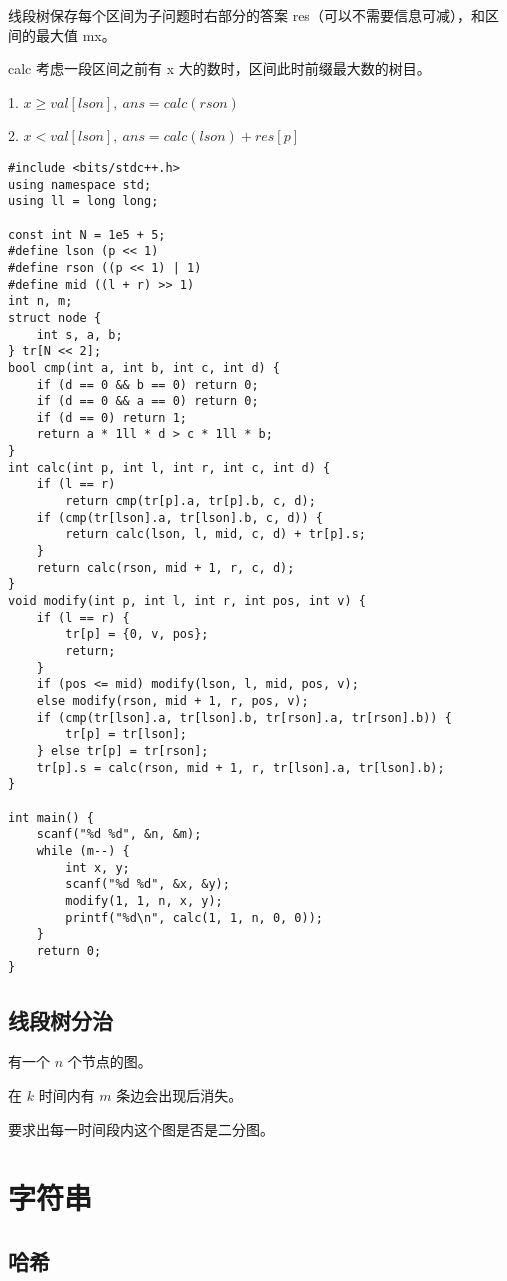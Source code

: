 \documentclass[a4paper]{article}
\begin{document}
线段树保存每个区间为子问题时右部分的答案 res（可以不需要信息可减），和区间的最大值 mx。

calc 考虑一段区间之前有 x 大的数时，区间此时前缀最大数的树目。

1. $x \geq val[lson],\ ans = calc(rson)$

2. $x < val[lson],\ ans = calc(lson) + res[p]$

\begin{lstlisting}
#include <bits/stdc++.h>
using namespace std;
using ll = long long;

const int N = 1e5 + 5;
#define lson (p << 1)
#define rson ((p << 1) | 1)
#define mid ((l + r) >> 1)
int n, m;
struct node {
    int s, a, b;
} tr[N << 2];
bool cmp(int a, int b, int c, int d) {
    if (d == 0 && b == 0) return 0;
    if (d == 0 && a == 0) return 0;
    if (d == 0) return 1;
    return a * 1ll * d > c * 1ll * b; 
}
int calc(int p, int l, int r, int c, int d) {
    if (l == r) 
        return cmp(tr[p].a, tr[p].b, c, d);
    if (cmp(tr[lson].a, tr[lson].b, c, d)) {
        return calc(lson, l, mid, c, d) + tr[p].s;
    }
    return calc(rson, mid + 1, r, c, d);
}
void modify(int p, int l, int r, int pos, int v) {
    if (l == r) {
        tr[p] = {0, v, pos};
        return;
    }
    if (pos <= mid) modify(lson, l, mid, pos, v);
    else modify(rson, mid + 1, r, pos, v);
    if (cmp(tr[lson].a, tr[lson].b, tr[rson].a, tr[rson].b)) {
        tr[p] = tr[lson];
    } else tr[p] = tr[rson];
    tr[p].s = calc(rson, mid + 1, r, tr[lson].a, tr[lson].b);
}

int main() {
    scanf("%d %d", &n, &m);
    while (m--) {
        int x, y;
        scanf("%d %d", &x, &y);
        modify(1, 1, n, x, y);
        printf("%d\n", calc(1, 1, n, 0, 0));
    }
    return 0;
}
\end{lstlisting}
\subsection{线段树分治}

有一个 $n$ 个节点的图。

在 $k$ 时间内有 $m$ 条边会出现后消失。

要求出每一时间段内这个图是否是二分图。



\section{字符串}
\subsection{哈希}
\end{document}
